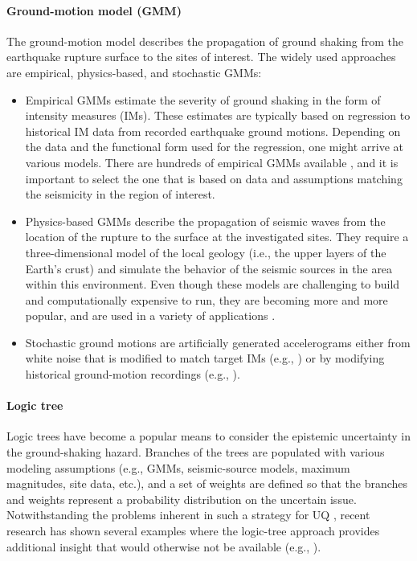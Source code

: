 \paragraph{Ground-motion model (GMM)} The ground-motion model describes the propagation of ground shaking from the earthquake rupture surface to the sites of interest. The widely used approaches are empirical, physics-based, and stochastic GMMs:
\begin{itemize}
    \item Empirical GMMs estimate the severity of ground shaking in the form of intensity measures (IMs). These estimates are typically based on regression to historical IM data from recorded earthquake ground motions. Depending on the data and the functional form used for the regression, one might arrive at various models. There are hundreds of empirical GMMs available
    \vspace{2mm}
    \citep{douglas2018ground}, and it is important to select the one that is based on data and assumptions matching the seismicity in the region of interest.
        \vspace{2mm}
    \item Physics-based GMMs describe the propagation of seismic waves from the location of the rupture to the surface at the investigated sites. They require a three-dimensional model of the local geology (i.e., the upper layers of the Earth's crust) and simulate the behavior of the seismic sources in the area within this environment. Even though these models are challenging to build and computationally expensive to run, they are becoming more and more popular, and are used in a variety of applications \citep{bradley2017guidance}. 
        \vspace{2mm}
    \item Stochastic ground motions are artificially generated accelerograms either from white noise that is modified to match target IMs (e.g., \cite{rezaeian2011simulation}) or by modifying historical ground-motion recordings (e.g., \cite{atkinson2010inelastic, seifried2016spectral}).
\end{itemize}

\paragraph{Logic tree} Logic trees have become a popular means to consider the epistemic uncertainty in the ground-shaking hazard. Branches of the trees are populated with various modeling assumptions (e.g., GMMs, seismic-source models, maximum magnitudes, site data, etc.), and a set of weights are defined so that the branches and weights represent a probability distribution on the uncertain issue. Notwithstanding the problems inherent in such a strategy for UQ \citep{bommer2008use}, recent research has shown several examples where the logic-tree approach provides additional insight that would otherwise not be available (e.g., \cite{goulet2017ngaeast}).

